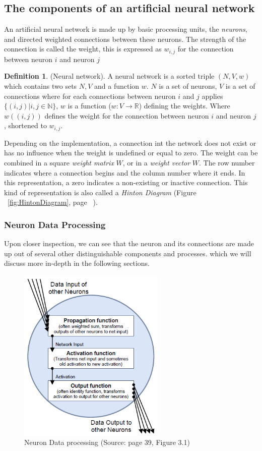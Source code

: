 \documentclass[pdftex,a4paper,12pt,twoside]{report}
\theoremstyle{plain} \newtheorem{theorem}{Theorem} \newtheorem{proposition}{Proposition} \newtheorem{lemma}{Lemma} \newtheorem*{corollary}{Corollary}
\theoremstyle{definition} \newtheorem{definition}{Definition} \newtheorem{conjecture}{Conjecture} \newtheorem*{example}{Example} \newtheorem{algorithm}{Algorithm}
\theoremstyle{remark} \newtheorem*{remark}{Remark} \newtheorem*{note}{Note} \newtheorem{case}{Case}
\begin{document}
\subsection{The components of an artificial neural network}
An artificial neural network is made up by basic processing units, the \emph{neurons}, and directed weighted connections between these neurons. The strength of the connection is called the weight, this is expressed as $w_{i,j}$ for the connection between neuron $i$ and neuron $j$
\begin{definition}
(Neural network). A neural network is a sorted triple $(N, V, w)$ which contains two sets $N, V$ and a function $w$. $N$ is a set of neurons, $V$ is a set of connections where for each connections between neuron $i$ and $j$ applies $\{(i,j)|i,j \in  \mathbb{N}\}$, $w$ is a function ($w : V \to \mathbb{R}$) defining the weights. Where $w((i,j))$ defines the weight for the connection between neuron $i$ and neuron $j$, shortened to $w_{i,j}$.
\end{definition} Depending on the implementation, a connection int the network does not exist or has no influence when the weight is undefined or equal to zero. The weight can be combined in a square \emph{weight matrix} $W$, or in a \emph{weight vector} $W$. The row number indicates where a connection begins and the column number where it ends. In this representation, a zero indicates a non-existing or inactive connection. This kind of representation is also called a \emph{Hinton Diagram} (Figure ~\ref{fig:HintonDiagram}, page ~\pageref{fig:HintonDiagram}).
\subsubsection{Neuron Data Processing}
Upon closer inspection, we can see that the neuron and its connections are made up out of several other distinguishable components and processes. which we will discuss more in-depth in the following sections.
\begin{figure}
\centering
\includegraphics[width=7cm]{./img/Neuron_Dataprocessing.png}
\caption{Neuron Data processing (Source: \citep{Kriesel2013} page 39, Figure 3.1)}
\end{figure}
\end{document}
